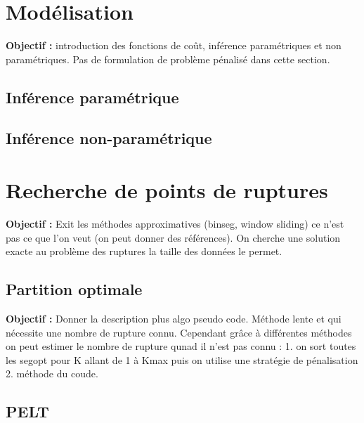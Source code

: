 \documentclass[12pt, twoside]{report}
\begin{document}

\section{Modélisation}

\textbf{Objectif :} introduction des fonctions de coût, inférence paramétriques et non paramétriques. Pas de formulation de problème pénalisé dans cette section.
\subsection{Inférence paramétrique}
\subsection{Inférence non-paramétrique}

\section{Recherche de points de ruptures}

\textbf{Objectif :} Exit les méthodes approximatives (binseg, window sliding) ce n'est pas ce que l'on veut (on peut donner des références). On cherche une solution exacte au problème des ruptures la taille des données le permet.

\subsection{Partition optimale}

\textbf{Objectif :} Donner la description plus algo pseudo code. Méthode lente et qui nécessite une nombre de rupture connu. Cependant grâce à différentes méthodes on peut estimer le nombre de rupture qunad il n'est pas connu : 1. on sort toutes les segopt pour K allant de 1 à Kmax puis on utilise une stratégie de pénalisation 2. méthode du coude.  

\subsection{PELT}
\end{document}
